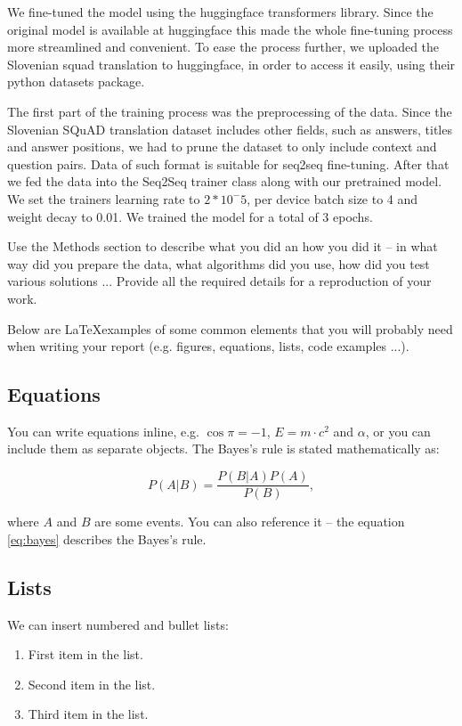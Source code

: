 \documentclass[fleqn,moreauthors,10pt]{ds_report}
\begin{document}
We fine-tuned the model using the huggingface transformers library. Since the original model is available at huggingface this made the whole fine-tuning process more streamlined and convenient. To ease the process further, we uploaded the Slovenian squad translation to huggingface, in order to access it easily, using their python datasets package. 

The first part of the training process was the preprocessing of the data. Since the Slovenian SQuAD translation dataset includes other fields, such as answers, titles and answer positions, we had to prune the dataset to only include context and question pairs. Data of such format is suitable for seq2seq fine-tuning. After that we fed the data into the Seq2Seq trainer class along with our pretrained model. We set the trainers learning rate to $2*10^-5$, per device batch size to 4 and weight decay to 0.01. We trained the model for a total of 3 epochs.


Use the Methods section to describe what you did an how you did it -- in what way did you prepare the data, what algorithms did you use, how did you test various solutions ... Provide all the required details for a reproduction of your work.

Below are \LaTeX examples of some common elements that you will probably need when writing your report (e.g. figures, equations, lists, code examples ...).


\subsection*{Equations}

You can write equations inline, e.g. $\cos\pi=-1$, $E = m \cdot c^2$ and $\alpha$, or you can include them as separate objects. The Bayes’s rule is stated mathematically as:

\begin{equation}
	P(A|B) = \frac{P(B|A)P(A)}{P(B)},
	\label{eq:bayes}
\end{equation}

where $A$ and $B$ are some events. You can also reference it -- the equation \ref{eq:bayes} describes the Bayes's rule.

\subsection*{Lists}

We can insert numbered and bullet lists:

\begin{enumerate}[noitemsep] 
	\item First item in the list.
	\item Second item in the list.
	\item Third item in the list.
\end{enumerate}
\end{document}
